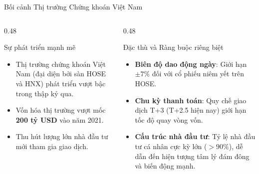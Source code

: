 \documentclass[10pt,aspectratio=169]{beamer}
\begin{document}
\begin{frame}{Bối cảnh Thị trường Chứng khoán Việt Nam}
  \begin{columns}[t]
    \begin{column}{0.48\textwidth}
      \begin{block}{Sự phát triển mạnh mẽ}
        \begin{itemize}
          \item Thị trường chứng khoán Việt Nam (đại diện bởi sàn HOSE và HNX) phát triển vượt bậc trong thập kỷ qua.
          \item Vốn hóa thị trường vượt mốc \textbf{200 tỷ USD} vào năm 2021.
          \item Thu hút lượng lớn nhà đầu tư mới tham gia giao dịch.
        \end{itemize}
      \end{block}
    \end{column}
    
    \begin{column}{0.48\textwidth}
      \begin{alertblock}{Đặc thù và Ràng buộc riêng biệt}
        \begin{itemize}
          \item \textbf{Biên độ dao động ngày}: Giới hạn $\pm 7\%$ đối với cổ phiếu niêm yết trên HOSE.
          \item \textbf{Chu kỳ thanh toán}: Quy chế giao dịch T+3 (T+2.5 hiện nay) giới hạn tốc độ quay vòng vốn.
          \item \textbf{Cấu trúc nhà đầu tư}: Tỷ lệ nhà đầu tư cá nhân cực kỳ lớn ($>90\%$), dễ dẫn đến hiện tượng tâm lý đám đông và biến động mạnh.
        \end{itemize}
      \end{alertblock}
    \end{column}
  \end{columns}
\end{frame}
\end{document}
